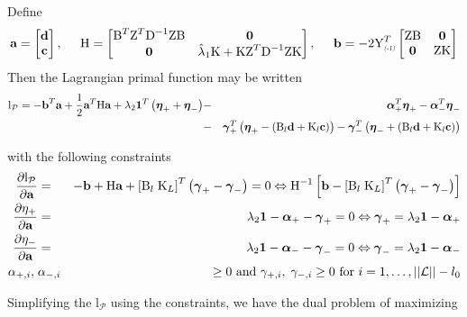 \documentclass[12pt]{article}
\newcommand{\bfeta}{\mbox{\boldmath $\eta$}}
\newcommand{\bfgamma}{\mbox{\boldmath $\gamma$}}
\newcommand{\bfalpha}{\mbox{\boldmath $\alpha$}}
\newcommand{\bfo}{\mbox{\boldmath $0$}}
\newcommand{\bfone}{\mbox{\boldmath $1$}}
\newcommand{\bfa}{\mbox{\bf a}}
\newcommand{\bfb}{\mbox{\bf b}}
\newcommand{\bfd}{\mbox{\bf d}}
\newcommand{\bfc}{\mbox{\bf c}}
\newcommand{\bigY}{\mbox{Y}}
\newcommand{\matK}{\mbox{K}}
\newcommand{\matH}{\mbox{H}}
\newcommand{\matB}{\mbox{B}}
\newcommand{\matD}{\mbox{D}}
\newcommand{\matZ}{\mbox{Z}}
\begin{document}
Define
\[
\bfa = \begin{bmatrix} \bfd\\ \bfc \end{bmatrix},\;\;\;\;\; \matH = \begin{bmatrix} \matB^T\matZ^T\matD^{-1}\matZ \matB & \bfo \\ \bfo & \hat{\lambda}_1\matK + \matK\matZ^T\matD^{-1}\matZ \matK   \end{bmatrix},\;\;\;\;\;\bfb = -2\bigY_{\textsc{\relsize{-2}{\textsl{(-1)}}}}^T\begin{bmatrix}\matZ\matB & \bfo \\ \bfo & \matZ\matK \end{bmatrix}
\]
\noindent
Then the Lagrangian primal function may be written
\begin{eqnarray}
\mathrm{l}_{\mathcal{P}} = -\bfb^T\bfa + \frac{1}{2}\bfa^T \matH \bfa + \lambda_2 \bfone^T\left( \bfeta_{+}+ \bfeta_{-}\right) &-& \bfalpha_+^T\bfeta_+ - \bfalpha_-^T\bfeta_{-} \label{lagrange_primal} \\ \nonumber
 &-& \bfgamma_+^T\left(\bfeta_+ - \left(\matB_l\bfd + \matK_l\bfc \right)  \right) - \bfgamma_-^T\left(\bfeta_- + \left(\matB_l\bfd + \matK_l\bfc \right)  \right) 
\end{eqnarray}

with the following constraints
\begin{eqnarray*}
\frac{\partial \mathrm{l}_{\mathcal{P}}}{\partial \bfa} &=& -\bfb + \matH\bfa + \left[ \matB_l\;\matK_L \right]^T \left(\bfgamma_+ - \bfgamma_- \right) = 0 \Leftrightarrow \matH^{-1}\left[ \bfb - \left[ \matB_l\;\matK_L \right]^T \left(\bfgamma_+ - \bfgamma_-\right) \right]  \\
\frac{\partial \eta_+}{\partial \bfa} &=& \lambda_2\bfone - \bfalpha_+ - \bfgamma_+ = 0 \Leftrightarrow \bfgamma_+ = \lambda_2\bfone - \bfalpha_+\\
\frac{\partial \eta_-}{\partial \bfa} &=& \lambda_2\bfone - \bfalpha_- - \bfgamma_- = 0 \Leftrightarrow \bfgamma_- = \lambda_2 \bfone - \bfalpha_-\\
\alpha_{+,i},\;&\alpha_{-,i}& \ge 0 \mbox{ and } \gamma_{+,i},\;\gamma_{-,i} \ge0 \mbox{ for }i=1,\dots,\vert \vert \mathcal{L}\vert \vert-l_0
\end{eqnarray*}

Simplifying the $\mathrm{l}_\mathcal{P}$ using the constraints, we have the dual problem of maximizing
\end{document}
